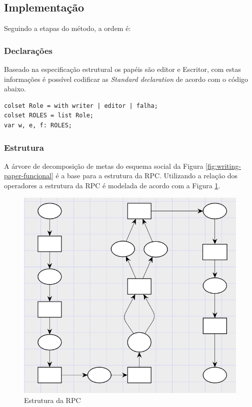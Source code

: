\subsection{Implementação}

Seguindo a etapas do método, a ordem é:

\subsubsection{Declarações}

Baseado na especificação estrutural os papéis são editor e Escritor, com estas informações é possível codificar as \textit{Standard declaration} de acordo com o código abaixo.


\begin{lstlisting}
colset Role = with writer | editor | falha;
colset ROLES = list Role;
var w, e, f: ROLES;
\end{lstlisting}

\subsubsection{Estrutura}

A árvore de decomposição de metas do esquema social da Figura \ref{fig:writing-paper-funcional} é a base para a estrutura da RPC. Utilizando a relação dos operadores a estrutura da RPC é modelada de acordo com a Figura \ref{fig:5-estrutura1}.

\begin{figure}[ht]
\centering
\includegraphics[scale=0.7]{imagens/5-estruturaRPC1.png}
\caption{Estrutura da RPC}
\label{fig:5-estrutura1}
\end{figure}

